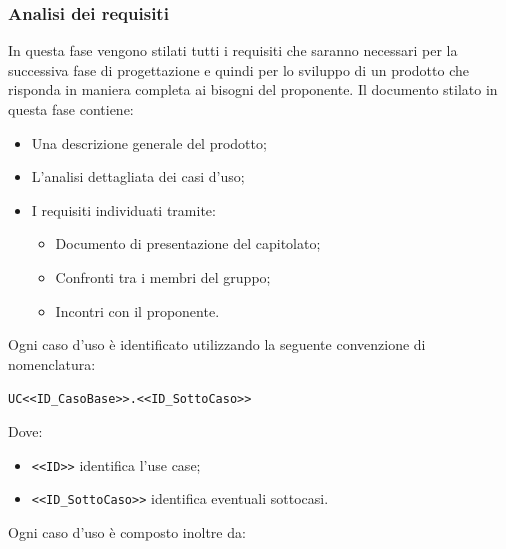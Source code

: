     \subsubsection{Analisi dei requisiti}
    In questa fase vengono stilati tutti i requisiti che saranno necessari per la successiva fase di progettazione e quindi per lo sviluppo di un prodotto che risponda in maniera completa ai bisogni del proponente.
    Il documento stilato in questa fase contiene:
    \begin{itemize}
    	\item Una descrizione generale del prodotto;
    	\item L'analisi dettagliata dei casi d'uso;
    	\item I requisiti individuati tramite:
        \begin{itemize}
            \item Documento di presentazione del capitolato;
            \item Confronti tra i membri del gruppo;
            \item Incontri con il proponente.
        \end{itemize}
    \end{itemize} 
    Ogni caso d'uso è identificato utilizzando la seguente convenzione di nomenclatura:
    \begin{center}
		\verb|UC<<ID_CasoBase>>.<<ID_SottoCaso>>|
    \end{center}
    Dove:
    \begin{itemize}
    	\item \verb|<<ID>>| identifica l'use case;
    	\item \verb|<<ID_SottoCaso>>| identifica eventuali sottocasi.
    \end{itemize}
	Ogni caso d'uso è composto inoltre da:
